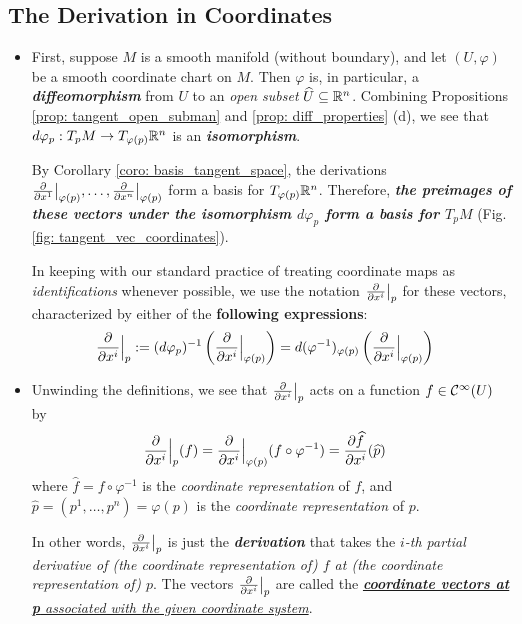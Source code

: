 \documentclass[11pt]{article}
\begin{document}
\subsection{The Derivation in Coordinates}
\begin{itemize}
\item First, suppose $M$ is a smooth manifold (without boundary), and let $(U, \varphi)$ be a smooth coordinate chart on $M$. Then $\varphi$ is, in particular, a \emph{\textbf{diffeomorphism}} from $U$ to an \emph{open subset} $\widehat{U} \subseteq {\mathbb R}^n$. Combining Propositions \ref{prop: tangent_open_subman} and \ref{prop: diff_properties} (d), we see that $d\varphi_{p}: T_{p}M \rightarrow T_{\varphi(p)}{\mathbb R}^n$ is an \emph{\textbf{isomorphism}}.

By Corollary \ref{coro: basis_tangent_space}, the derivations $\frac{\partial }{ \partial x^{1}}\big|_{\varphi(p)}, \ldots, \frac{\partial }{ \partial x^{n}}\big|_{\varphi(p)}$ form a basis for $T_{\varphi(p)}{\mathbb R}^n$. Therefore, \emph{\textbf{the preimages of these vectors under the \emph{isomorphism} $d\varphi_p$ form a basis for $T_{p}M$}} (Fig. \ref{fig: tangent_vec_coordinates}).

In keeping with our standard practice of treating coordinate maps as \emph{identifications} whenever possible, we use the notation $\frac{\partial }{ \partial x^{i}}\big|_{p}$ for these vectors, characterized by either of the \textbf{following expressions}:
\begin{align}
\frac{\partial }{ \partial x^{i}}\Bigr|_{p} &:= (d\varphi_{p})^{-1}\left(\frac{\partial }{ \partial x^{i}}\Bigr|_{\varphi(p)}\right) 
= d(\varphi^{-1})_{\varphi(p)}\left(\frac{\partial }{ \partial x^{i}}\Bigr|_{\varphi(p)}\right) \label{eqn: identification_tangent_basis}
\end{align}

\item Unwinding the definitions, we see that $\frac{\partial }{ \partial x^{i}}\big|_{p}$ acts on a function $f \in {\mathcal C}^{\infty}(U)$ by
\begin{align*}
\frac{\partial }{ \partial x^{i}}\Bigr|_{p}(f) &= \frac{\partial }{ \partial x^{i}}\Bigr|_{\varphi(p)}(f \circ \varphi^{-1}) = \frac{\partial \widehat{f}}{ \partial x^{i}}(\widehat{p})
\end{align*} where $\widehat{f} = f \circ \varphi^{-1}$ is the \emph{coordinate representation} of $f$, and $\widehat{p} = (p^1, \ldots, p^n) = \varphi(p)$ is the \emph{coordinate representation} of $p$.

\begin{definition}
In other words, $\frac{\partial }{ \partial x^{i}}\big|_{p}$ is just the \textbf{\emph{derivation}} that takes the \emph{$i$-th partial derivative of (the coordinate representation of) $f$ at (the coordinate representation of) $p$}. The vectors $\frac{\partial }{ \partial x^{i}}\big|_{p}$ are called the \underline{\emph{\textbf{coordinate vectors at p} associated with the given coordinate system}}.
\end{definition}


\end{itemize}
\end{document}
